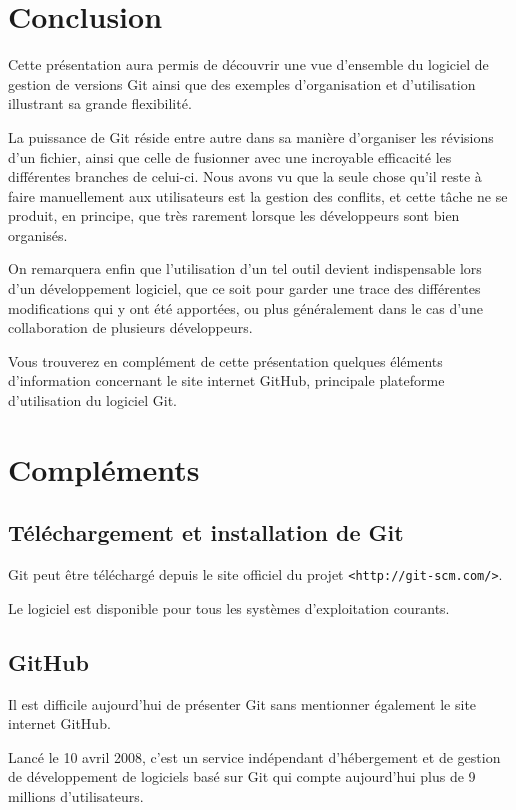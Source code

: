 \documentclass[11pt,a4paper]{article}
\begin{document}
\section{Conclusion}

Cette présentation aura permis de découvrir une vue d'ensemble du logiciel de gestion de versions Git ainsi que des exemples d'organisation et d'utilisation illustrant sa grande flexibilité. 

La puissance de Git réside entre autre dans sa manière d'organiser les révisions d'un fichier, ainsi que celle de fusionner avec une incroyable efficacité les différentes branches de celui-ci. Nous avons vu que la seule chose qu'il reste à faire manuellement aux utilisateurs est la gestion des conflits, et cette tâche ne se produit, en principe, que très rarement lorsque les développeurs sont bien organisés.

On remarquera enfin que l'utilisation d'un tel outil devient indispensable lors d'un développement logiciel, que ce soit pour garder une trace des différentes modifications qui y ont été apportées, ou plus généralement dans le cas d'une collaboration de plusieurs développeurs.

Vous trouverez en complément de cette présentation quelques éléments d'information concernant le site internet GitHub, principale plateforme d'utilisation du logiciel Git.

\pagebreak
{}
\section{Compléments}

\subsection{Téléchargement et installation de Git}

Git peut être téléchargé depuis le site officiel du projet {\tt <http://git-scm.com/>}.

Le logiciel est disponible pour tous les systèmes d'exploitation courants.

\subsection{GitHub}

Il est difficile aujourd'hui de présenter Git sans mentionner également le site internet GitHub.

Lancé le 10 avril 2008, c'est un service indépendant d'hébergement et de gestion de développement de logiciels basé sur Git qui compte aujourd'hui plus de 9 millions d'utilisateurs.
\end{document}
